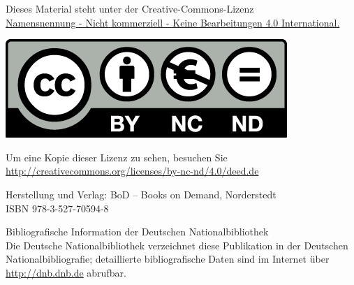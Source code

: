 \documentclass[10pt,paper=17cm:22cm, twoside=true, DIV=14]{scrbook}
\begin{document}
\begin{titlepage}
\begin{center}
\begin{center}
\end{center}

\begin{center}
   Dieses Material steht unter der Creative-Commons-Lizenz\\
   \href{http://creativecommons.org/licenses/by-nc-nd/4.0/deed.de}{Namensnennung - Nicht kommerziell - Keine Bearbeitungen 4.0 International.} \\
    \end{center}
    \begin{center}
        \href{http://creativecommons.org/licenses/by-nc-nd/4.0/deed.de}{\includegraphics[scale=0.2]{figures/by-nc-nd_eu.png}}
    \end{center}
	\begin{center}
       Um eine Kopie dieser Lizenz zu sehen, besuchen Sie\\
       \href{http://creativecommons.org/licenses/by-nc-nd/4.0/deed.de}{http://creativecommons.org/licenses/by-nc-nd/4.0/deed.de}\\
	\end{center}
	Herstellung und Verlag: BoD – Books on Demand, Norderstedt\\
		  \vspace{0.3cm}
    {ISBN 978-3-527-70594-8}\\
	  \vspace{0.3cm}
\begin{minipage}{0.73\textwidth}
\begin{flushleft}
\begin{small}
  Bibliografische Information der Deutschen Nationalbibliothek\\
  Die Deutsche Nationalbibliothek verzeichnet diese Publikation in der Deutschen Nationalbibliografie; detaillierte bibliografische Daten sind im Internet über \href{http://dnb.dnb.de}{http://dnb.dnb.de} abrufbar.
\end{small}
\end{flushleft}
\end{minipage}
\end{center}
\end{titlepage}
\cleardoublepage
\end{document}

